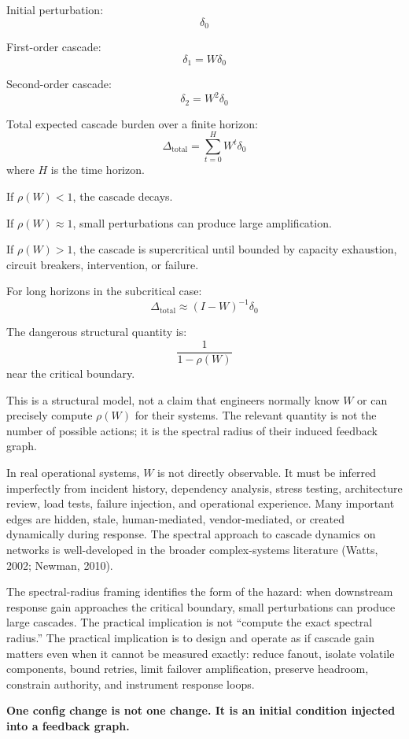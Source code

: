 \documentclass[11pt]{article}
\begin{document}
Initial perturbation:
\[
\delta_0
\]

First-order cascade:
\[
\delta_1 = W \delta_0
\]

Second-order cascade:
\[
\delta_2 = W^2 \delta_0
\]

Total expected cascade burden over a finite horizon:
\[
\Delta_{\text{total}} = \sum_{t=0}^{H} W^t \delta_0
\]
where $H$ is the time horizon.

If $\rho(W) < 1$, the cascade decays.

If $\rho(W) \approx 1$, small perturbations can produce large amplification.

If $\rho(W) > 1$, the cascade is supercritical until bounded by capacity exhaustion, circuit breakers, intervention, or failure.

For long horizons in the subcritical case:
\[
\Delta_{\text{total}} \approx (I - W)^{-1} \delta_0
\]

The dangerous structural quantity is:
\[
\frac{1}{1 - \rho(W)}
\]
near the critical boundary.

This is a structural model, not a claim that engineers normally know $W$ or can precisely compute $\rho(W)$ for their systems. The relevant quantity is not the number of possible actions; it is the spectral radius of their induced feedback graph.

In real operational systems, $W$ is not directly observable. It must be inferred imperfectly from incident history, dependency analysis, stress testing, architecture review, load tests, failure injection, and operational experience. Many important edges are hidden, stale, human-mediated, vendor-mediated, or created dynamically during response. The spectral approach to cascade dynamics on networks is well-developed in the broader complex-systems literature (Watts, 2002; Newman, 2010).

The spectral-radius framing identifies the form of the hazard: when downstream response gain approaches the critical boundary, small perturbations can produce large cascades. The practical implication is not ``compute the exact spectral radius.'' The practical implication is to design and operate as if cascade gain matters even when it cannot be measured exactly: reduce fanout, isolate volatile components, bound retries, limit failover amplification, preserve headroom, constrain authority, and instrument response loops.

\begin{pullquote}
\textbf{One config change is not one change. It is an initial condition injected into a feedback graph.}
\end{pullquote}
\end{document}
